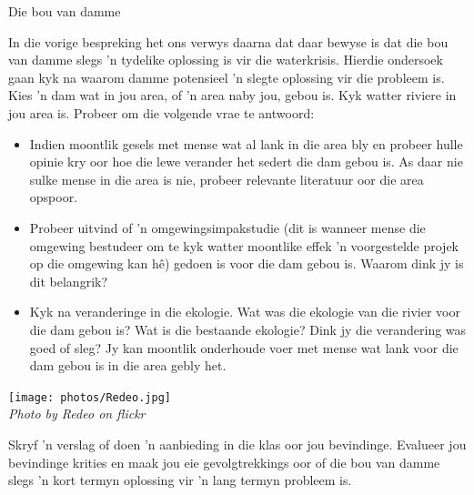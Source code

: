 \par 
\label{m38138*id0123}
            \begin{Investigation}{Die bou van damme}
            \nopagebreak

\label{m38138*id0128031}In die vorige bespreking het ons verwys daarna dat daar bewyse is dat die bou van damme slegs   'n tydelike oplossing is vir die waterkrisis. Hierdie ondersoek gaan kyk na waarom damme potensieel   'n slegte oplossing vir die probleem is. \\
\label{m38138*id473692}Kies   'n dam wat in jou area, of   'n area naby jou, gebou is. Kyk watter riviere in jou area is. Probeer om die volgende vrae te antwoord: \\
\begin{minipage}{.7\textwidth}
\label{m38138*id774}\begin{itemize}[noitemsep]
            \label{m38138*id034582}\item Indien moontlik gesels met mense wat al lank in die area bly en probeer hulle opinie kry oor hoe die lewe verander het sedert die dam gebou is. As daar nie sulke mense in die area is nie, probeer relevante literatuur oor die area opspoor.
\label{m38138*id08323}\item Probeer uitvind of   'n omgewingsimpakstudie (dit is wanneer mense die omgewing bestudeer om te kyk watter moontlike effek   'n voorgestelde projek op die omgewing kan hê) gedoen is voor die dam gebou is. Waarom dink jy is dit belangrik?
\label{m38138*id0832346}\item 
Kyk na veranderinge in die ekologie. Wat was die ekologie van die rivier voor die dam gebou is? Wat is die bestaande ekologie? Dink jy die verandering was goed of sleg? Jy kan moontlik onderhoude voer met mense wat lank voor die dam gebou is in die area gebly het. 
\end{itemize}
        \par 
\end{minipage}
\begin{minipage}{.3\textwidth}
 \begin{center}
  \texttt{[image: photos/Redeo.jpg]} \\
\textsl{Photo by Redeo on flickr}
 \end{center}

\end{minipage}
\label{m38138*id08322432}
Skryf   'n verslag of doen   'n aanbieding in die klas oor jou bevindinge. Evalueer jou bevindinge krities en maak jou eie gevolgtrekkings oor of die bou van damme slegs   'n kort termyn oplossing vir   'n lang termyn probleem is.
\end{Investigation}
